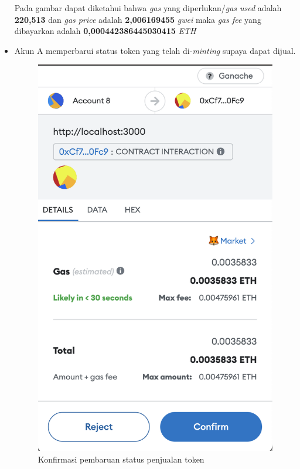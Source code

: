 \begin{itemize}
    Pada gambar dapat diketahui bahwa \emph{gas} yang diperlukan/\emph{gas used} adalah \textbf{220,513} dan \emph{gas price} adalah \textbf{2,006169455} \emph{gwei} maka \emph{gas fee} yang dibayarkan adalah \textbf{0,000442386445030415} \emph{ETH}
    \item Akun A memperbarui status token yang telah di-\emph{minting} supaya dapat dijual.
    \begin{figure} [H] \centering
        \includegraphics[scale=0.3]{gambar/img-test-buy-put-item-for-sale-1.png}
        \caption{Konfirmasi pembaruan status penjualan token}
        \label{fig:TestBuyKonfirmasiPembaruanPenjual}

\end{figure}
\end{itemize}
